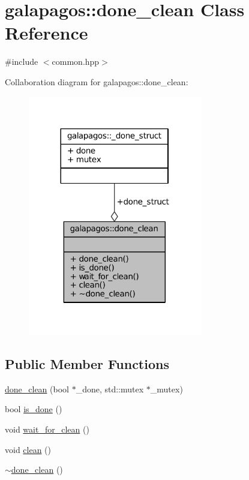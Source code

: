 \hypertarget{classgalapagos_1_1done__clean}{}\section{galapagos\+:\+:done\+\_\+clean Class Reference}
\label{classgalapagos_1_1done__clean}


{\ttfamily \#include $<$common.\+hpp$>$}



Collaboration diagram for galapagos\+:\+:done\+\_\+clean\+:
\nopagebreak
\begin{figure}[H]
\begin{center}
\leavevmode
\includegraphics[width=216pt]{classgalapagos_1_1done__clean__coll__graph}
\end{center}
\end{figure}
\subsection*{Public Member Functions}
\begin{DoxyCompactItemize}
\item 
\hyperlink{classgalapagos_1_1done__clean_a5b815435d55228e92e852456b5a7b37e}{done\+\_\+clean} (bool $\ast$\+\_\+done, std\+::mutex $\ast$\+\_\+mutex)
\item 
bool \hyperlink{classgalapagos_1_1done__clean_a6e5d83850c00996e31f4b5d614ac1090}{is\+\_\+done} ()
\item 
void \hyperlink{classgalapagos_1_1done__clean_a6fbb19d798f9f3bd38a1fbaf85ab41ca}{wait\+\_\+for\+\_\+clean} ()
\item 
void \hyperlink{classgalapagos_1_1done__clean_af62181e719163c90982991b76a1c9fbb}{clean} ()
\item 
\hyperlink{classgalapagos_1_1done__clean_a4a6358456f183fa4ba794432fe2e17a0}{$\sim$done\+\_\+clean} ()
\end{DoxyCompactItemize}
